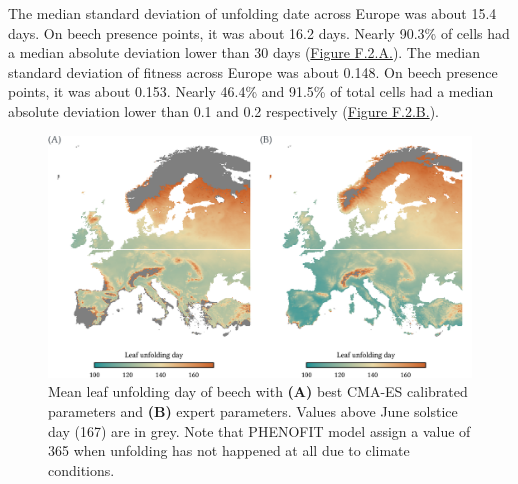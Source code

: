 \documentclass[11pt,]{article}
\begin{document}
The median standard deviation of unfolding date across Europe was about
15.4 days. On beech presence points, it was about 16.2 days. Nearly
90.3\% of cells had a median absolute deviation lower than 30 days
(\hyperref[fig:consensusfitnessmap]{Figure F.2.A.}). The median standard
deviation of fitness across Europe was about 0.148. On beech presence
points, it was about 0.153. Nearly 46.4\% and 91.5\% of total cells had
a median absolute deviation lower than 0.1 and 0.2 respectively
(\hyperref[fig:consensusfitnessmap]{Figure F.2.B.}).

\begin{figure}[H]

{\centering \includegraphics{figs/unfoldingdatesbackforw} 

}

\caption{Mean leaf unfolding day of beech with \textbf{(A)} best CMA-ES calibrated parameters and \textbf{(B)} expert parameters. Values above June solstice day (167) are in grey. Note that PHENOFIT model assign a value of 365 when unfolding has not happened at all due to climate conditions.}\label{fig:unfoldingdatesbackforw}
\end{figure}





\newpage
\singlespacing
\printbibliography
\end{document}
